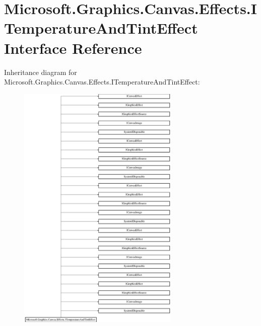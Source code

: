 \hypertarget{interface_microsoft_1_1_graphics_1_1_canvas_1_1_effects_1_1_i_temperature_and_tint_effect}{}\section{Microsoft.\+Graphics.\+Canvas.\+Effects.\+I\+Temperature\+And\+Tint\+Effect Interface Reference}
\label{interface_microsoft_1_1_graphics_1_1_canvas_1_1_effects_1_1_i_temperature_and_tint_effect}
Inheritance diagram for Microsoft.\+Graphics.\+Canvas.\+Effects.\+I\+Temperature\+And\+Tint\+Effect\+:\begin{figure}[H]
\begin{center}
\leavevmode
\includegraphics[height=12.000000cm]{interface_microsoft_1_1_graphics_1_1_canvas_1_1_effects_1_1_i_temperature_and_tint_effect}
\end{center}
\end{figure}
